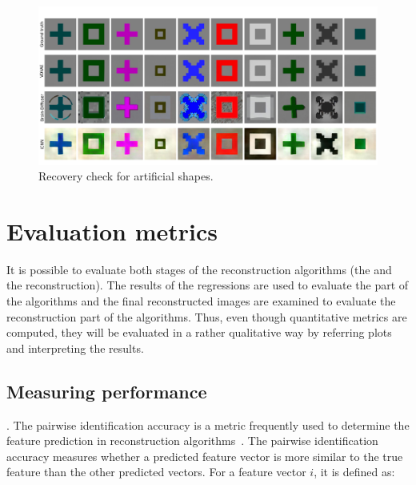 \begin{figure}[ht]
    \centering
    \includegraphics[width=1\textwidth]{plots/baseline_qual_true_recon_art.JPEG}
    \caption[Recovery check for artificial shapes]{Recovery check for artificial shapes. }\label{fig:baselinetruerecon_art}
\end{figure}


\section{Evaluation metrics}

It is possible to evaluate both stages of the reconstruction algorithms (the  and the reconstruction). The results of the regressions are used to evaluate the  part of the algorithms and the final reconstructed images are examined to evaluate the reconstruction part of the algorithms.  Thus, even though quantitative metrics are computed, they will be evaluated in a rather qualitative way by referring plots and interpreting the results.


\subsection{Measuring  performance}
. The pairwise identification accuracy is a metric frequently used to determine the feature prediction in reconstruction algorithms~\cite{shirakawaSpuriousReconstructionBrain2024}. 
The pairwise identification accuracy measures whether a predicted feature vector is more similar to the true feature than the other predicted vectors. For a feature vector $i$, it is defined as:


